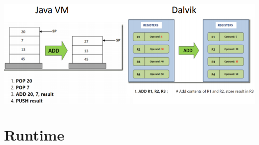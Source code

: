\documentclass{article}
\begin{document}
\begin{center}
  \includegraphics[scale=0.6]{stack_vs_register.png}
\end{center}

\section{Runtime}
\end{document}
